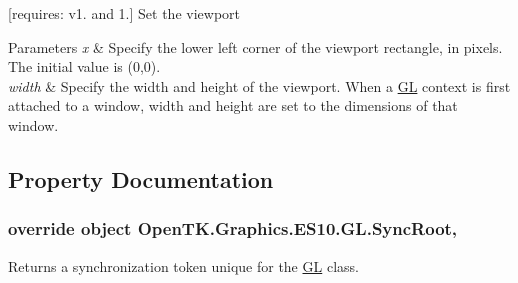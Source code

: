 \mbox{[}requires\-: v1. and 1.\mbox{]} Set the viewport 


\begin{DoxyParams}{Parameters}
{\em x} & Specify the lower left corner of the viewport rectangle, in pixels. The initial value is (0,0). \\
\hline
{\em width} & Specify the width and height of the viewport. When a \hyperlink{class_open_t_k_1_1_graphics_1_1_e_s10_1_1_g_l}{G\-L} context is first attached to a window, width and height are set to the dimensions of that window. \\
\hline
\end{DoxyParams}


\subsection{Property Documentation}
\hypertarget{class_open_t_k_1_1_graphics_1_1_e_s10_1_1_g_l_a96a1a2fa150951082651b492c29e5aba}{
\subsubsection[{Sync\-Root}]{\setlength{\rightskip}{0pt plus 5cm}override object Open\-T\-K.\-Graphics.\-E\-S10.\-G\-L.\-Sync\-Root\hspace{0.3cm}{\ttfamily [get]}, {\ttfamily [protected]}}}\label{class_open_t_k_1_1_graphics_1_1_e_s10_1_1_g_l_a96a1a2fa150951082651b492c29e5aba}


Returns a synchronization token unique for the \hyperlink{class_open_t_k_1_1_graphics_1_1_e_s10_1_1_g_l}{G\-L} class. 

